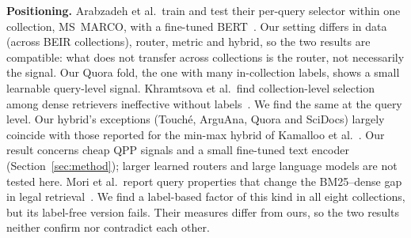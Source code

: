 \documentclass[conference]{IEEEtran}
\begin{document}
\textbf{Positioning.} Arabzadeh et al.\ train and test their per-query selector within one collection, MS~MARCO, with a fine-tuned BERT~\cite{arabzadeh2021predicting}. Our setting differs in data (across BEIR collections), router, metric and hybrid, so the two results are compatible: what does not transfer across collections is the router, not necessarily the signal. Our Quora fold, the one with many in-collection labels, shows a small learnable query-level signal. Khramtsova et al.\ find collection-level selection among dense retrievers ineffective without labels~\cite{khramtsova2023selecting}. We find the same at the query level. Our hybrid's exceptions (Touch\'e, ArguAna, Quora and SciDocs) largely coincide with those reported for the min-max hybrid of Kamalloo et al.~\cite{kamalloo2024resources}. Our result concerns cheap QPP signals and a small fine-tuned text encoder (Section~\ref{sec:method}); larger learned routers and large language models are not tested here. Mori et al.\ report query properties that change the BM25--dense gap in legal retrieval~\cite{mori2025assessing}. We find a label-based factor of this kind in all eight collections, but its label-free version fails. Their measures differ from ours, so the two results neither confirm nor contradict each other.
\end{document}
